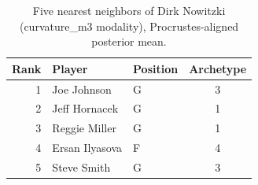 \begin{table}[htbp]
  \centering\small
  \begin{tabular}{rllc}
    \toprule
    Rank & Player & Position & Archetype \\
    \midrule
    1 & Joe Johnson & G & 3 \\
    2 & Jeff Hornacek & G & 1 \\
    3 & Reggie Miller & G & 1 \\
    4 & Ersan Ilyasova & F & 4 \\
    5 & Steve Smith & G & 3 \\
    \bottomrule
  \end{tabular}
  \caption{Five nearest neighbors of Dirk Nowitzki (curvature_m3 modality), Procrustes-aligned posterior mean.}
  \label{tab:Dirk_Nowitzki_neighbors_curvature_m3}
\end{table}

